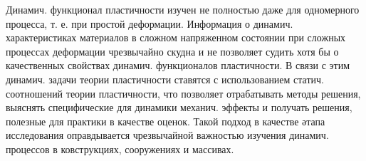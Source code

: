 \documentclass[10pt]{article}
\begin{document}
Динамич. функционал пластичности изучен не полностью даже для одномерного процесса, т. е. при простой деформации. Информация о динамич. характеристиках материалов в сложном напряженном состоянии при сложных процессах деформации чрезвычайно скудна и не позволяет судить хотя бы о качественных свойствах динамич. функционалов пластичности. В связи с этим динамич. задачи теории пластичности ставятся с использованием статич. соотношений теории пластичности, что позволяет отрабатывать методы решения, выяснять специфические для динамики механич. эффекты и получать решения, полезные для практики в качестве оценок. Такой подход в качестве әтапа исследования оправдывается чрезвычайной важностью изучения динамич. процессов в ковструкциях, сооружениях и массивах.
\end{document}

